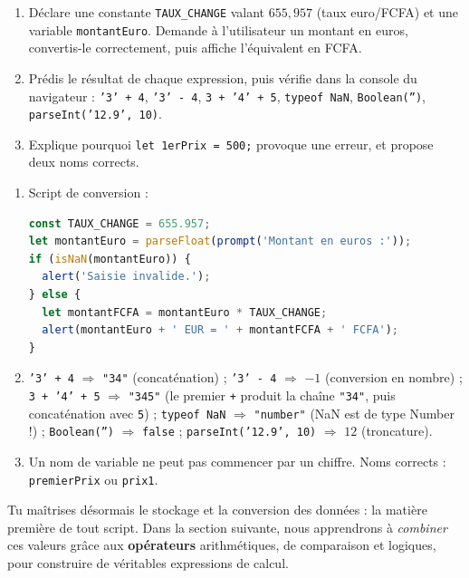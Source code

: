 \documentclass[11pt]{article}
\begin{document}
\begin{exercice}
\begin{enumerate}
  \item Déclare une constante \texttt{TAUX\_CHANGE} valant $655{,}957$ (taux euro/FCFA) et une variable \texttt{montantEuro}. Demande à l'utilisateur un montant en euros, convertis-le correctement, puis affiche l'équivalent en FCFA.
  \item Prédis le résultat de chaque expression, puis vérifie dans la console du navigateur : \texttt{'3' + 4}, \texttt{'3' - 4}, \texttt{3 + '4' + 5}, \texttt{typeof NaN}, \texttt{Boolean('')}, \texttt{parseInt('12.9', 10)}.
  \item Explique pourquoi \texttt{let 1erPrix = 500;} provoque une erreur, et propose deux noms corrects.
\end{enumerate}
\end{exercice}

\begin{corrige}
\begin{enumerate}
  \item Script de conversion :
\begin{lstlisting}[language=JavaScript]
const TAUX_CHANGE = 655.957;
let montantEuro = parseFloat(prompt('Montant en euros :'));
if (isNaN(montantEuro)) {
  alert('Saisie invalide.');
} else {
  let montantFCFA = montantEuro * TAUX_CHANGE;
  alert(montantEuro + ' EUR = ' + montantFCFA + ' FCFA');
}
\end{lstlisting}
  \item \texttt{'3' + 4} $\Rightarrow$ \texttt{"34"} (concaténation) ; \texttt{'3' - 4} $\Rightarrow$ $-1$ (conversion en nombre) ; \texttt{3 + '4' + 5} $\Rightarrow$ \texttt{"345"} (le premier \texttt{+} produit la chaîne \texttt{"34"}, puis concaténation avec \texttt{5}) ; \texttt{typeof NaN} $\Rightarrow$ \texttt{"number"} (NaN est de type Number !) ; \texttt{Boolean('')} $\Rightarrow$ \texttt{false} ; \texttt{parseInt('12.9', 10)} $\Rightarrow$ $12$ (troncature).
  \item Un nom de variable ne peut pas commencer par un chiffre. Noms corrects : \texttt{premierPrix} ou \texttt{prix1}.
\end{enumerate}
\end{corrige}

Tu maîtrises désormais le stockage et la conversion des données : la matière première de tout script. Dans la section suivante, nous apprendrons à \emph{combiner} ces valeurs grâce aux \textbf{opérateurs} arithmétiques, de comparaison et logiques, pour construire de véritables expressions de calcul.
\end{document}
